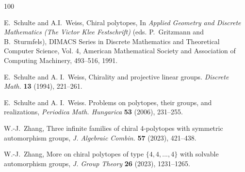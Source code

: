 \documentclass[12pt]{article}
\theoremstyle{definition}\newtheorem{definition}{Definition}[section]
\begin{document}
\begin{thebibliography}{100}

E.~Schulte and A.I.~Weiss, Chiral polytopes, In \textit{Applied Geometry and Discrete Mathematics (The Victor Klee Festschrift)} (eds. P.~Gritzmann and B.~Sturmfels), DIMACS Series in Discrete Mathematics and Theoretical Computer Science, Vol. 4, American Mathematical Society and Association of Computing Machinery, 493--516, 1991.

 E.~Schulte and A. I.~Weiss, Chirality and projective linear groups. \textit{Discrete Math.} {\bf 13} (1994), 221--261.

E.~Schulte and A. I.~Weiss. Problems on polytopes, their groups, and realizations, \textit{Periodica Math. Hungarica} {\bf 53} (2006), 231--255.

W.-J.~Zhang, Three infinite families of chiral 4-polytopes with symmetric automorphism groups, {\it J. Algebraic Combin.} {\bf 57} (2023),  421--438.

W.-J.~Zhang, More on chiral polytopes of type $\{4, 4, . . . , 4\}$ with solvable automorphism groups, \textit{J. Group Theory} {\bf 26} (2023), 1231--1265.

\end{thebibliography}
\end{document}

